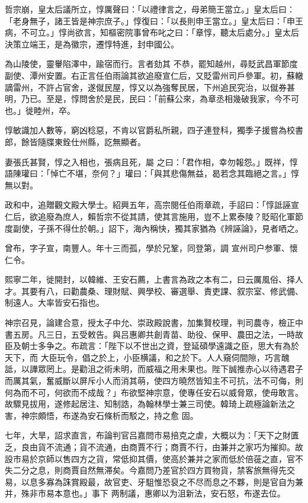 \begin{pinyinscope}
 哲宗崩，皇太后議所立，惇厲聲曰：「以禮律言之，母弟簡王當立。」皇太后曰：「老身無子，諸王皆是神宗庶子。」惇復曰：「以長則申王當立。」皇太后曰：「申王病，不可立。」惇尚欲言，知樞密院事曾布叱之曰：「章惇，聽太后處分。」皇太后決策立端王，是為徽宗，遷惇特進，封申國公。



 為山陵使，靈轝陷澤中，踰宿而行。言者劾其
 不恭，罷知越州，尋貶武昌軍節度副使、潭州安置。右正言任伯雨論其欲追廢宣仁后，又貶雷州司戶參軍。初，蘇轍謫雷州，不許占官舍，遂僦民屋，惇又以為強奪民居，下州追民究治，以僦券甚明，乃已。至是，惇問舍於是民，民曰：「前蘇公來，為章丞相幾破我家，今不可也。」徙睦州，卒。



 惇敏識加人數等，窮凶稔惡，不肯以官爵私所親，四子連登科，獨季子援嘗為校書郎，餘皆隨牒東銓仕州縣，訖無顯者。



 妻張氏甚賢，惇之入相也，張病且死，屬
 之曰：「君作相，幸勿報怨。」既祥，惇語陳瓘曰：「悼亡不堪，奈何？」瓘曰：「與其悲傷無益，曷若念其臨絕之言。」惇無以對。



 政和中，追贈觀文殿大學士。紹興五年，高宗閱任伯雨章疏，手詔曰：「惇詆誣宣仁后，欲追廢為庶人，賴哲宗不從其請，使其言施用，豈不上累泰陵？貶昭化軍節度副使，子孫不得仕於朝。」詔下，海內稱快，獨其家猶為《辨誣論》，見者哂之。



 曾布，字子宣，南豐人。年十三而孤，學於兄鞏，同登第，調
 宣州司户参軍、懷仁令。



 熙寧二年，徙開封，以韓維、王安石薦，上書言為政之本有二，曰云厲風俗、择人才。其要有八，曰勸農桑、理財賦、興學校、審選舉、責吏課、叙宗室、修武備、制遠人。大率皆安石指也。



 神宗召見，論建合意，授太子中允、崇政殿說書，加集賢校理，判司農寺，檢正中書五房。凡三日，五受敕告。與吕惠卿共創青苗、助役、保甲、農田之法，一時故臣及朝士多争之。布疏言：「陛下以不世出之資，登延碩學遠識之臣，思大有為於天下，而
 大臣玩令，倡之於上，小臣横議，和之於下。人人窺伺間隙，巧言醜詆，以譁眾罔上。是勸沮之術未明，而威福之用未果也。陛下誠推赤心以待遇君子而厲其氣，奮威斷以屏斥小人而消其萌，使四方曉然皆知主不可抗，法不可侮，則何為而不可，何欲而不成哉？」布欲堅神宗意，使專任安石以威脅眾，使毋敢言。故驟見拔用，遂修起居注、知制誥，為翰林學士兼三司使。韓琦上疏極論新法之害，神宗頗悟，布遂為安石條析而駁之，持之愈
 固。



 七年，大旱，詔求直言，布論判官吕嘉問市易掊克之虐，大概以为：「天下之財匱乏，良由貨不流通；貨不流通，由商賈不行；商賈不行，由兼并之家巧为摧抑。故設市易於京師以售四方之貨，常低抑其價，使高於兼并之家而低於倍蓰之直，官不失二分之息，則商賈自然無滞矣。今嘉問乃差官於四方買物貨，禁客旅無得先交易，以息多寡為誅賞殿最，故官吏、牙駔惟恐裒之不尽而息之不夥，則是官自为兼并，殊非市易本意也。」事下
 两制議，惠卿以为沮新法，安石怒，布遂去位。




\end{pinyinscope}

